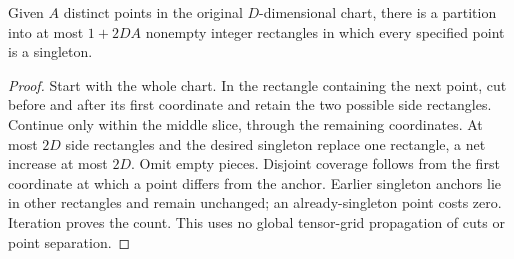 \begin{lemma}\label{lem:isolation}
Given $A$ distinct points in the original $D$-dimensional chart, there is a
partition into at most $1+2DA$ nonempty integer rectangles in which every
specified point is a singleton.
\end{lemma}
\begin{proof}
Start with the whole chart. In the rectangle containing the next point,
cut before and after its first coordinate and retain the two possible side
rectangles. Continue only within the middle slice, through the remaining
coordinates. At most $2D$ side rectangles and the desired singleton replace
one rectangle, a net increase at most $2D$. Omit empty pieces. Disjoint
coverage follows from the first coordinate at which a point differs from
the anchor. Earlier singleton anchors lie in other rectangles and remain
unchanged; an already-singleton point costs zero. Iteration proves the count.
This uses no global tensor-grid propagation of cuts or point separation.
\end{proof}
